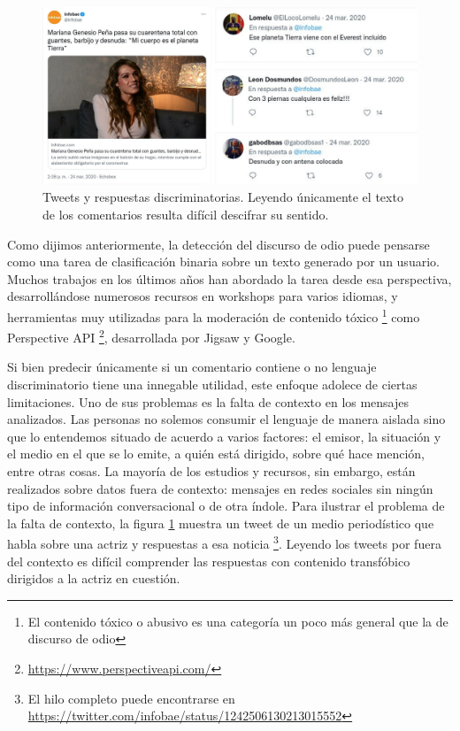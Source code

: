 \begin{figure}
    \centering
    \includegraphics[width=\textwidth]{img/01/tweets_contexto.pdf}
    \caption{Tweets y respuestas discriminatorias. Leyendo únicamente el texto de los comentarios resulta difícil descifrar su sentido. }
    \label{fig:01_tweets_y_su_contexto}
\end{figure}

Como dijimos anteriormente, la detección del discurso de odio puede pensarse como una tarea de clasificación binaria sobre un texto generado por un usuario. Muchos trabajos en los últimos años han abordado la tarea desde esa perspectiva, desarrollándose numerosos recursos en workshops para varios idiomas, y herramientas muy utilizadas para la moderación de contenido tóxico \footnote{El contenido tóxico o abusivo es una categoría un poco más general que la de discurso de odio} como Perspective API \footnote{\url{https://www.perspectiveapi.com/}}, desarrollada por Jigsaw y Google.

Si bien predecir únicamente si un comentario contiene o no lenguaje discriminatorio tiene una innegable utilidad, este enfoque adolece de ciertas limitaciones. Uno de sus problemas es la falta de contexto en los mensajes analizados. Las personas no solemos consumir el lenguaje de manera aislada sino que lo entendemos situado de acuerdo a varios factores: el emisor, la situación y el medio en el que se lo emite, a quién está dirigido, sobre qué hace mención, entre otras cosas. La mayoría de los estudios y recursos, sin embargo, están realizados sobre datos fuera de contexto: mensajes en redes sociales sin ningún tipo de información conversacional o de otra índole. Para ilustrar el problema de la falta de contexto, la figura \ref{fig:01_tweets_y_su_contexto} muestra un tweet de un medio periodístico que habla sobre una actriz y respuestas a esa noticia \footnote{El hilo completo puede encontrarse en \url{https://twitter.com/infobae/status/1242506130213015552}}. Leyendo los tweets por fuera del contexto es difícil comprender las respuestas con contenido transfóbico dirigidos a la actriz en cuestión.

